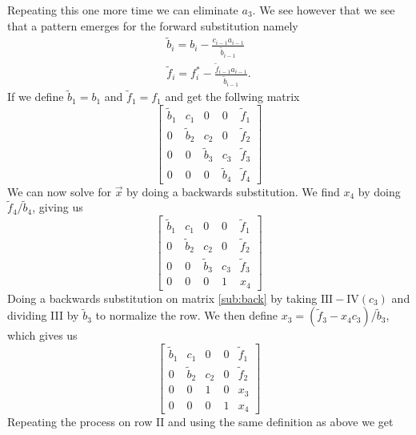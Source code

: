 \documentclass[10pt, a4paper]{amsart}
\begin{document}
Repeating this one more time we can eliminate $a_3$. We see however that we see that a pattern emerges for the forward substitution namely 
\begin{equation}\label{algo:forward_sub}
\begin{split}
	\tilde{b}_i = b_i -\frac{c_{i-1}a_{i-1}}{\tilde{b}_{i-1}} \\
	\tilde{f}_i = f^*_i - \frac{\tilde{f}_{i-1}a_{i-1}}{\tilde{b}_{i-1}}.
\end{split}
\end{equation}
If we define $\tilde{b}_1 = b_1$ and $\tilde{f}_1 = f_1$ and get the follwing matrix 
\begin{equation}
\left[
  \begin{array}{cccc|c}
	\tilde{b}_1 & c_1 & 0 & 0 & \tilde{f}_1\\
	0 & \tilde{b}_2 & c_2 & 0 & \tilde{f}_2\\
	0 & 0 & \tilde{b}_3 & c_3 & \tilde{f}_3\\
	0 & 0 & 0 & \tilde{b}_4 & \tilde{f}_4
  \end{array}
 \right]
\end{equation}
We can now solve for $\vec{x}$ by doing a backwards substitution. We find $x_4$ by doing $\tilde{f}_4/\tilde{b}_4$, giving us 
\begin{equation}\label{sub:back}
\left[
  \begin{array}{cccc|c}
	\tilde{b}_1 & c_1 & 0 & 0 & \tilde{f}_1\\
	0 & \tilde{b}_2 & c_2 & 0 & \tilde{f}_2\\
	0 & 0 & \tilde{b}_3 & c_3 & \tilde{f}_3\\
	0 & 0 & 0 & 1 & x_4
  \end{array}
 \right]
\end{equation}
Doing a backwards substitution on matrix \ref{sub:back} by taking $\textrm{III} - \textrm{IV}(c_3)$ and dividing \textrm{III} by $\tilde{b}_3$ to normalize the row. We then define $x_3 = (\tilde{f}_3 - x_4c_3)/\tilde{b}_3$, which gives us 
\begin{equation}
\left[
  \begin{array}{cccc|c}
	\tilde{b}_1 & c_1 & 0 & 0 & \tilde{f}_1\\
	0 & \tilde{b}_2 & c_2 & 0 & \tilde{f}_2\\
	0 & 0 & 1 & 0 & x_3\\
	0 & 0 & 0 & 1 & x_4
  \end{array}
 \right]
\end{equation}
Repeating the process on row \textrm{II} and using the same definition as above we get
\end{document}
